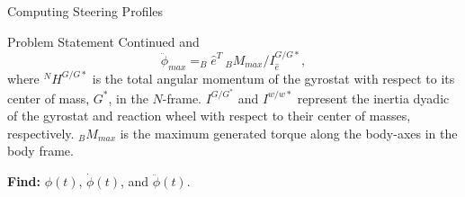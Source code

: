 \documentclass{beamer}
\begin{document}
\begin{frame}{Computing Steering Profiles}
\begin{block}{ Problem Statement Continued}
 and
 \begin{equation}\label{phiddotmax}
\ddot{\phi}_{max}=_B\hat{e}^T\  _BM_{max}/I_{\hat{e}}^{G/G*},
\end{equation}
where $^NH^{G/G*}$ is the total angular momentum of the gyrostat with respect to its center of mass, $G^*$, in the $N$-frame. $I^{G/G^*}$ and $I^{w/w*}$ represent the inertia dyadic of the gyrostat and reaction wheel with respect to their center of masses, respectively. $_BM_{max}$ is the maximum generated torque along the body-axes in the body frame.\\
\vspace{0.5in}

{\bf Find:} $\phi(t)$, $\dot{\phi}(t)$, and $\ddot{\phi}(t)$.
\end{block}
\end{frame}
%
%
\end{document}
